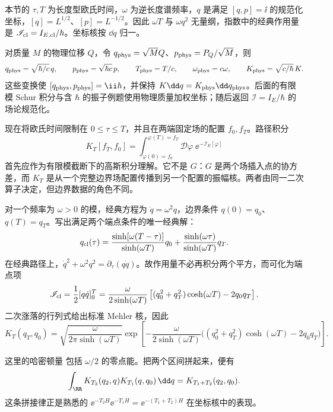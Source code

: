 \begin{definition}[振子坐标与核测度的单位换算]
本节的 $\tau,T$ 为长度型欧氏时间，$\omega$ 为逆长度谱频率，$q$ 是满足 $[q,p]=\ii$ 的规范化坐标，$[q]=L^{1/2}$、$[p]=L^{-1/2}$。因此 $\omega T$ 与 $\omega q^2$ 无量纲，指数中的经典作用量是 $\mathscr I_{\rm cl}=I_{E,\rm cl}/\hbar$。坐标核按 $\dd q$ 归一。

对质量 $M$ 的物理位移 $Q$，令 $q_{\rm phys}=\sqrt M Q$、$p_{\rm phys}=P_Q/\sqrt M$，则
\[
 q_{\rm phys}=\sqrt{\hbar/c}\,q,\qquad p_{\rm phys}=\sqrt{\hbar c}\,p,\qquad T_{\rm phys}=T/c,\qquad
 \omega_{\rm phys}=c\omega,\qquad K_{\rm phys}=\sqrt{c/\hbar}\,K.
\]
这些变换使 $[q_{\rm phys},p_{\rm phys}]=\ii\hbar$，并保持 $K\dd q=K_{\rm phys}\dd q_{\rm phys}$。后面的有限模 Schur 积分与含 $\hbar$ 的振子例题使用物理质量加权坐标；随后返回 $\mathscr I=I_E/\hbar$ 的场论规范化。
\end{definition}

现在将欧氏时间限制在 $0\le\tau\le T$，并且在两端固定场的配置 $f_0,f_T$。路径积分
\[
 K_T[f_T,f_0]=\int_{\varphi(0)=f_0}^{\varphi(T)=f_T}
 \mathcal D\varphi\;\ee^{-\mathscr I_E[\varphi]}
\]
首先应作为有限模截断下的高斯积分理解。它不是 $G$：$G$ 是两个场插入点的协方差，而 $K_T$ 是从一个完整边界场配置传播到另一个配置的振幅核。两者由同一二次算子决定，但边界数据的角色不同。

\begin{example}
对一个频率为 $\omega>0$ 的模，经典方程为 $\ddot q=\omega^2q$，边界条件 $q(0)=q_0$、$q(T)=q_T$。写出满足两个端点条件的唯一经典解：
\begin{equation}\label{eq:ghs-bridge-classical-path}
 q_{\rm cl}(\tau)=
 \frac{\sinh[\omega(T-\tau)]}{\sinh(\omega T)}q_0
 +\frac{\sinh(\omega\tau)}{\sinh(\omega T)}q_T.
\end{equation}
在经典路径上，$\dot q^2+\omega^2q^2=\partial_\tau(q\dot q)$。故作用量不必再积分两个平方，而可化为端点项
\[
 \mathscr I_{\rm cl}=\frac12[q\dot q]_0^T
 =\frac{\omega}{2\sinh(\omega T)}
 \left[(q_0^2+q_T^2)\cosh(\omega T)-2q_0q_T\right].
\]
二次涨落的行列式给出标准 Mehler 核，因此
\begin{equation}\label{eq:ghs-bridge-Mehler}
 K_T(q_T,q_0)=
 \sqrt{\frac{\omega}{2\pi\sinh(\omega T)}}
 \exp\left[-\frac{\omega}{2\sinh(\omega T)}
 \bigl((q_0^2+q_T^2)\cosh(\omega T)-2q_0q_T\bigr)\right].
\end{equation}
\end{example}

这里的哈密顿量 包括 $\omega/2$ 的零点能。把两个区间拼起来，便有
\begin{equation}\label{eq:ghs-bridge-kernel-gluing}
 \int_{\RR}K_{T_2}(q_2,q)K_{T_1}(q,q_0)\,\dd q
 =K_{T_1+T_2}(q_2,q_0).
\end{equation}
这条拼接律正是熟悉的 $\ee^{-T_2H}\ee^{-T_1H}=\ee^{-(T_1+T_2)H}$ 在坐标核中的表现。



